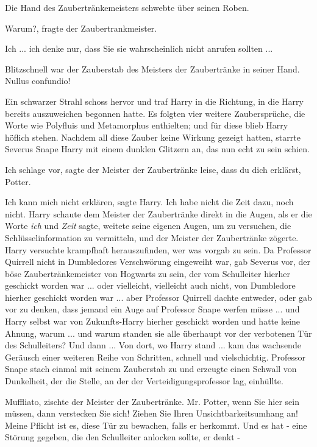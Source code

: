 Die Hand des Zaubertränkemeisters schwebte über seinen Roben.

\glqq{}Warum?\grqq{}, fragte der Zaubertrankmeister.

\glqq{}Ich ... ich denke nur, dass Sie sie wahrscheinlich nicht anrufen
sollten ...\grqq{}

Blitzschnell war der Zauberstab des Meisters der Zaubertränke in seiner Hand.
\glqq{}Nullus confundio!\grqq{}

Ein schwarzer Strahl schoss hervor und traf Harry in die Richtung, in die Harry
bereits auszuweichen begonnen hatte. Es folgten vier weitere Zaubersprüche, die
Worte wie Polyfluis und Metamorphus enthielten; und für diese blieb Harry
höflich stehen. Nachdem all diese Zauber keine Wirkung gezeigt hatten, starrte
Severus Snape Harry mit einem dunklen Glitzern an, das nun echt zu sein schien.

\glqq{}Ich schlage vor\grqq{}, sagte der Meister der Zaubertränke leise, \glqq{}
dass du dich erklärst, Potter.\grqq{}

\glqq{}Ich kann mich nicht erklären\grqq{}, sagte Harry. \glqq{}Ich habe nicht die
Zeit dazu, noch nicht.\grqq{} Harry schaute dem Meister der Zaubertränke direkt
in die Augen, als er die Worte \glqq{}\emph{ich}\grqq{} und \glqq{}
\emph{Zeit}\grqq{} sagte, weitete seine eigenen Augen, um zu versuchen, die
Schlüsselinformation zu vermitteln, und der Meister der Zaubertränke zögerte.
Harry versuchte krampfhaft herauszufinden, wer was vorgab zu sein. Da Professor
Quirrell nicht in Dumbledores Verschwörung eingeweiht war, gab Severus vor, der
böse Zaubertränkemeister von Hogwarts zu sein, der vom Schulleiter hierher
geschickt worden war ... oder vielleicht, vielleicht auch nicht, von Dumbledore
hierher geschickt worden war ... aber Professor Quirrell dachte entweder, oder
gab vor zu denken, dass jemand ein Auge auf Professor Snape werfen müsse ... und
Harry selbst war von Zukunfts-Harry hierher geschickt worden und hatte keine
Ahnung, warum ... und warum standen sie alle überhaupt vor der verbotenen Tür des
Schulleiters? Und dann ... Von dort, wo Harry stand ... kam das wachsende Geräusch
einer weiteren Reihe von Schritten, schnell und vielschichtig. Professor Snape
stach einmal mit seinem Zauberstab zu und erzeugte einen Schwall von Dunkelheit,
der die Stelle, an der der Verteidigungsprofessor lag, einhüllte.

\glqq{}Muffliato\grqq{}, zischte der Meister der Zaubertränke. \glqq{}Mr. Potter,
wenn Sie hier sein müssen, dann verstecken Sie sich! Ziehen Sie Ihren
Unsichtbarkeitsumhang an! Meine Pflicht ist es, diese Tür zu bewachen, falls er
herkommt. Und es hat - eine Störung gegeben, die den Schulleiter anlocken
sollte, er denkt -\grqq{}

